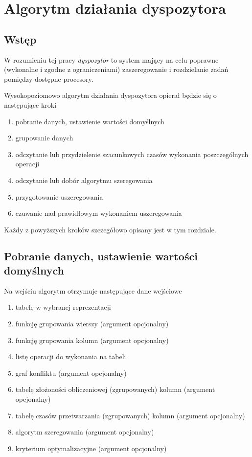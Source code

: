 \documentclass[brudnopis]{xmgr}
\begin{document}
\chapter{Algorytm działania dyspozytora}


\section{Wstęp}

W rozumieniu tej pracy \emph{dyspozytor} to system mający na celu poprawne (wykonalne i zgodne z ograniczeniami) zaszeregowanie i rozdzielanie zadań pomiędzy dostępne procesory.
\medskip

Wysokopoziomowo algorytm działania dyspozytora opierał będzie się o następujące kroki

\begin{enumerate}
    \item pobranie danych, ustawienie wartości domyślnych
    \item grupowanie danych
    \item odczytanie lub przydzielenie szacunkowych czasów wykonania poszczególnych operacji
    \item odczytanie lub dobór algorytmu szeregowania 
    \item przygotowanie uszeregowania
    \item czuwanie nad prawidłowym wykonaniem uszeregowania
\end{enumerate}

Każdy z powyższych kroków szczegółowo opisany jest w tym rozdziale.
\newpage


\section{Pobranie danych, ustawienie wartości domyślnych}

Na wejściu algorytm otrzymuje następujące dane wejściowe

\begin{enumerate}
    \item tabelę w wybranej reprezentacji
    \item funkcję grupowania wierszy (argument opcjonalny)
    \item funkcję grupowania kolumn (argument opcjonalny)
    \item listę operacji do wykonania na tabeli
    \item graf konfliktu (argument opcjonalny)
    \item tabelę złożoności obliczeniowej (zgrupowanych) kolumn (argument opcjonalny)
    \item tabelę czasów przetwarzania (zgrupowanych) kolumn (argument opcjonalny)
    \item algorytm szeregowania (argument opcjonalny)
    \item kryterium optymalizacyjne (argument opcjonalny)
\end{enumerate}
\end{document}
